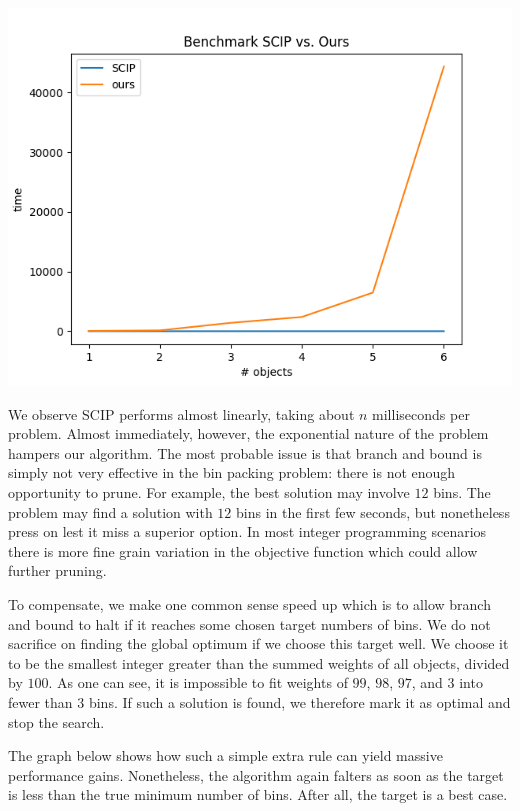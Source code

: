 \documentclass{article}
\begin{document}
\begin{center}
    \includegraphics[scale=0.5]{benchmark_no_target}
\end{center}

We observe SCIP performs almost linearly, taking about $n$ milliseconds per problem. Almost immediately, however, the exponential nature of the problem hampers our algorithm. The most probable issue is that branch and bound is simply not very effective in the bin packing problem: there is not enough opportunity to prune. For example, the best solution may involve $12$ bins. The problem may find a solution with $12$ bins in the first few seconds, but nonetheless press on lest it miss a superior option. In most integer programming scenarios there is more fine grain variation in the objective function which could allow further pruning.

To compensate, we make one common sense speed up which is to allow branch and bound to halt if it reaches some chosen target numbers of bins. We do not sacrifice on finding the global optimum if we choose this target well. We choose it to be the smallest integer greater than the summed weights of all objects, divided by $100$. As one can see, it is impossible to fit weights of $99$, $98$, $97$, and $3$ into fewer than $3$ bins. If such a solution is found, we therefore mark it as optimal and stop the search.

The graph below shows how such a simple extra rule can yield massive performance gains. Nonetheless, the algorithm again falters as soon as the target is less than the true minimum number of bins. After all, the target is a best case.
\end{document}
